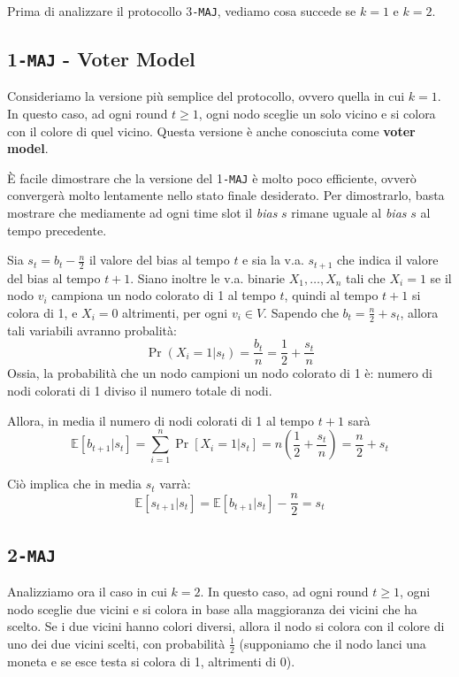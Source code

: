 Prima di analizzare il protocollo $3$\texttt{-MAJ}, vediamo cosa succede se $k = 1$ e $k = 2$.

\subsection{1\texttt{-MAJ} - Voter Model}

Consideriamo la versione più semplice del protocollo, ovvero quella in cui $k = 1$. In questo caso, ad ogni round $t \geq 1$, ogni nodo sceglie un solo vicino e si colora con il colore di quel vicino. Questa versione è anche conosciuta come \textbf{voter model}.

È facile dimostrare che la versione del 1\texttt{-MAJ} è molto poco efficiente, ovverò convergerà molto lentamente nello stato finale desiderato. Per dimostrarlo, basta mostrare che mediamente ad ogni time slot il \textit{bias} $s$ rimane uguale al \textit{bias} $s$ al tempo precedente.

Sia $s_t = b_t - \frac{n}{2}$ il valore del bias al tempo $t$ e sia la v.a. $s_{t+1}$ che indica il valore del bias al tempo $t+1$. Siano inoltre le v.a. binarie $X_1, \dots, X_n$ tali che $X_i = 1$ se il nodo $v_i$ campiona un nodo colorato di 1 al tempo $t$, quindi al tempo $t+1$ si colora di 1, e $X_i = 0$ altrimenti, per ogni $v_i \in V$. Sapendo che $b_t = \frac{n}{2} + s_t$, allora tali variabili avranno probalità:
\[
    \Pr(X_i = 1 | s_t) = \frac{b_t}{n} = \frac{1}{2} + \frac{s_t}{n}
\]
Ossia, la probabilità che un nodo campioni un nodo colorato di 1 è: numero di nodi colorati di 1 diviso il numero totale di nodi.

Allora, in media il numero di nodi colorati di 1 al tempo $t+1$ sarà
\[
    \mathbb{E}[b_{t+1} | s_t] = \sum_{i=1}^n \Pr[X_i = 1| s_t] = n\left( \frac{1}{2} + \frac{s_t}{n} \right) = \frac{n}{2} + s_t
\]

Ciò implica che in media $s_t$ varrà:
\[
    \mathbb{E}[s_{t+1} | s_t] = \mathbb{E}[b_{t+1} | s_t] - \frac{n}{2} = s_t
\]

\subsection{2\texttt{-MAJ}}

Analizziamo ora il caso in cui $k = 2$. In questo caso, ad ogni round $t \geq 1$, ogni nodo sceglie due vicini e si colora in base alla maggioranza dei vicini che ha scelto. Se i due vicini hanno colori diversi, allora il nodo si colora con il colore di uno dei due vicini scelti, con probabilità $\frac{1}{2}$ (supponiamo che il nodo lanci una moneta e se esce testa si colora di 1, altrimenti di 0).

